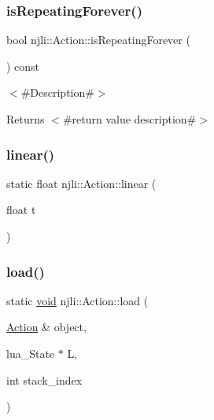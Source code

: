 \mbox{\label{classnjli_1_1_action_af53c39e134a055c410ccccdf94943ff0}} 
\subsubsection{\texorpdfstring{is\+Repeating\+Forever()}{isRepeatingForever()}}
{\footnotesize\ttfamily bool njli\+::\+Action\+::is\+Repeating\+Forever (\begin{DoxyParamCaption}{ }\end{DoxyParamCaption}) const}

$<$\#\+Description\#$>$

\begin{DoxyReturn}{Returns}
$<$\#return value description\#$>$ 
\end{DoxyReturn}
\mbox{\label{classnjli_1_1_action_ae86773a5e972de01ad5203b333c01bcc}} 
\subsubsection{\texorpdfstring{linear()}{linear()}}
{\footnotesize\ttfamily static float njli\+::\+Action\+::linear (\begin{DoxyParamCaption}\item[{float}]{t }\end{DoxyParamCaption})\hspace{0.3cm}{\ttfamily [static]}}

\mbox{\label{classnjli_1_1_action_ad9a591ace0350439b796698f75b4665b}} 
\subsubsection{\texorpdfstring{load()}{load()}}
{\footnotesize\ttfamily static \mbox{\hyperlink{_thread_8h_af1e856da2e658414cb2456cb6f7ebc66}{void}} njli\+::\+Action\+::load (\begin{DoxyParamCaption}\item[{\mbox{\hyperlink{classnjli_1_1_action}{Action}} \&}]{object,  }\item[{lua\+\_\+\+State $\ast$}]{L,  }\item[{int}]{stack\+\_\+index }\end{DoxyParamCaption})\hspace{0.3cm}{\ttfamily [static]}}

